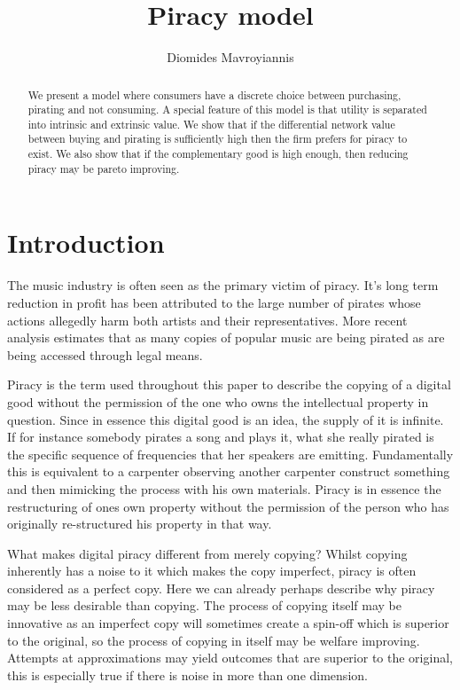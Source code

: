 \documentclass{article}
\begin{document}
\title{Piracy model}
\author{Diomides Mavroyiannis}

\maketitle

\begin{abstract}
We present a model where consumers have a discrete choice between purchasing, pirating and not consuming. A special feature of this model is that utility is separated into intrinsic and extrinsic value. We show that if the differential network value between buying and pirating is sufficiently high then the firm prefers for piracy to exist. We also show that if the complementary good is high enough, then reducing piracy may be pareto improving. 
\end{abstract}

\section{Introduction}

The music industry is often seen as the primary victim of piracy. It's long term reduction in profit has been attributed to the large number of pirates whose actions allegedly harm both artists and their representatives\citep{B03}. More recent analysis estimates that as many copies of popular music are being pirated as are being accessed through legal means\citep{O15}.

\iffalse
Piracy is the term used throughout this paper to describe the copying of a digital good without the permission of the one who owns the intellectual property in question. Since in essence this digital good is an idea, the supply of it is infinite. If for instance somebody pirates a song and plays it, what she really pirated is the specific sequence of frequencies that her speakers are emitting. Fundamentally this is equivalent to a carpenter observing another carpenter construct something and then mimicking the process with his own materials. Piracy is in essence the restructuring of ones  own property without the permission of the person who has originally re-structured his property in that way. 

What makes digital piracy different from merely copying? Whilst copying inherently has a noise to it which makes the copy imperfect, piracy is often considered as a perfect copy. Here we can already perhaps describe why piracy may be less desirable than copying. The process of copying itself may be innovative as an imperfect copy will sometimes create a spin-off which is superior to the original, so the process of copying in itself may be welfare improving. Attempts at approximations may yield outcomes that are superior to the original, this is especially true if there is noise in more than one dimension. 
\end{document}
